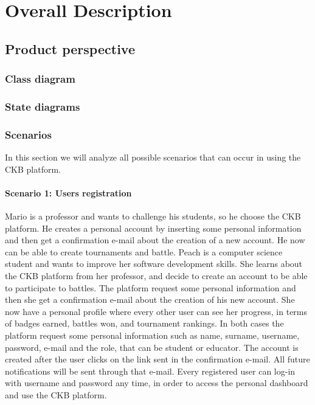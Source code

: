\chapter{Overall Description}

\section{Product perspective}
\subsection{Class diagram}
\subsection{State diagrams}
\clearpage

\subsection{Scenarios}
In this section we will analyze all possible scenarios that can occur in using the CKB platform.

\subsubsection{Scenario 1: Users registration}
Mario is a professor and wants to challenge his students, so he choose the CKB platform. He creates a personal account by inserting some personal information and then get a confirmation e-mail about the creation of a new account. He now can be able to create tournaments and battle. \newline
Peach is a computer science student and wants to improve her software development skills. She learns about the CKB platform from her professor, and decide to create an account to be able to participate to battles. The platform request some personal information and then she get a confirmation e-mail about the creation of his new account. She now have a personal profile where every other user can see her progress, in terms of badges earned, battles won, and tournament rankings. \newline
In both cases the platform request some personal information such as name, surname, username, password, e-mail and the role, that can be student or educator. The account is created after the user clicks on the link sent in the confirmation e-mail. All future notifications will be sent through that e-mail. \newline
Every registered user can log-in with username and password any time, in order to access the personal dashboard and use the CKB platform.

